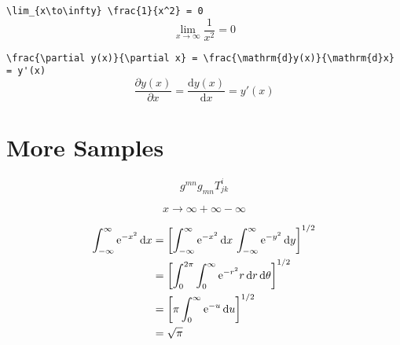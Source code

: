 \documentclass { article }
\begin{document}
\verb|\lim_{x\to\infty} \frac{1}{x^2} = 0|
\[ \lim_{x\to\infty} \frac{1}{x^2} = 0 \]

\verb|\frac{\partial y(x)}{\partial x} = \frac{\mathrm{d}y(x)}{\mathrm{d}x} = y'(x)|
\[ \frac{\partial y(x)}{\partial x} = \frac{\mathrm{d}y(x)}{\mathrm{d}x} = y'(x) \]

\section{More Samples}

\def\ee{\mathrm{e}}
\def\ii{\mathrm{i}}
\def\bm{\symbf}
\newcommand{\innerprod}[2]{\left\langle{#1}\middle\vert{#2}\right\rangle}
\newcommand{\brakket}[3]{\left\langle{#1}\middle\vert{#2}\middle\vert{#3}\right\rangle}

\[ g^{mn} g_{mn} T^{i}_{jk} \]

\[ x \to \infty + \infty - \infty \]

\begin{align*}
     \int_{-\infty}^\infty \ee^{-x^2} \dd{x}
  &= \qty[\int_{-\infty}^\infty \ee^{-x^2} \dd{x} \, \int_{-\infty}^\infty \ee^{-y^2} \dd{y}]^{1/2} \\
  &= \qty[\int_0^{2\pi} \int_0^\infty \ee^{-r^2} r \dd{r}\dd{\theta}]^{1/2} \\
  &= \qty[\pi \int_0^\infty \ee^{-u} \dd{u}]^{1/2} \\
  &= \sqrt{\pi}
\end{align*}
\end{document}
